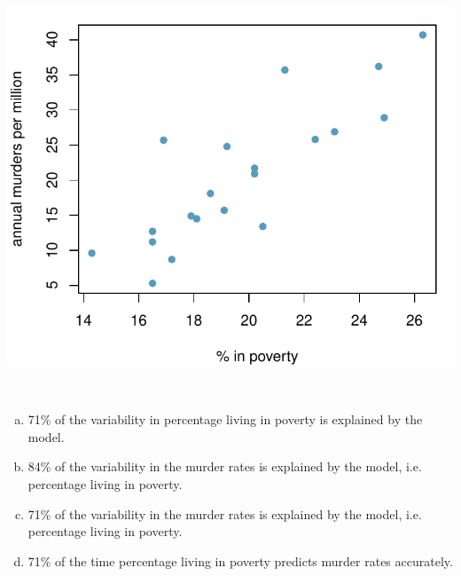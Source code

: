 \documentclass[slidestop,compress,mathserif,12pt,t,professionalfonts,xcolor=table]{beamer}
\newcommand{\solnMult}[1]{#1}
\begin{document}

\begin{frame}
\frametitle{}

{
\begin{center}
\includegraphics[width=\textwidth]{figures/murder/annual_murders_per_mil_perc_pov}
\end{center}
}

$\:$ \\

\begin{enumerate}[(a)]

\item 71\% of the variability in percentage living in poverty is explained by the model.

\item 84\% of the variability in the murder rates is explained by the model, i.e. percentage living in poverty.

\item \solnMult{71\% of the variability in the murder rates is explained by the model, i.e. percentage living in poverty.}

\item 71\% of the time percentage living in poverty predicts murder rates accurately.

\end{enumerate}

\end{frame}
\end{document}
